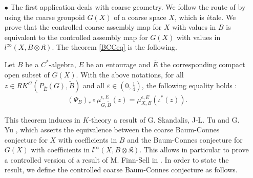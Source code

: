 \begin{itemize}

\item[$\bullet$] The first application deals with coarse geometry. We follow the route of \cite{SkTuYu} by using the coarse groupoid $G(X)$ of a coarse space $X$, which is étale. We prove that the controlled coarse assembly map for $X$ with values in $B$ is equivalent to the controlled assembly map for $G(X)$ with values in $l^\infty(X,B\otimes\mathfrak K)$. The theorem \ref{BCCeq} is the following.\\

\begin{thm}
Let $B$ be a $C^*$-algebra, $E$ be an entourage and $\overline{E}$ the corresponding compact open subset of $G(X)$. With the above notations, for all $z\in RK^G(P_{\overline E}(G),\tilde B)$ and all $\varepsilon\in(0,\frac{1}{4})$, the following equality holds :
\[(\Psi_B)_*\circ\mu^{\epsilon,\overline E}_{G,\tilde B} (z) = \mu_{X,B}^{\epsilon,E}(\iota^*(z)).\]
\end{thm}

This theorem induces in $K$-theory a result of G. Skandalis, J-L. Tu and G. Yu \cite{SkTuYu}, which asserts the equivalence between the coarse Baum-Connes conjecture for $X$ with coefficients in $B$ and the Baum-Connes conjecture for $G(X)$ with coefficients in $l^\infty(X,B\otimes \mathfrak K)$. This allows in particular to prove a controlled version of a result of M. Finn-Sell in \cite{FinnSellFibred}. In order to state the result, we define the controlled coarse Baum-Connes conjecture as follows. \\


\end{itemize}
